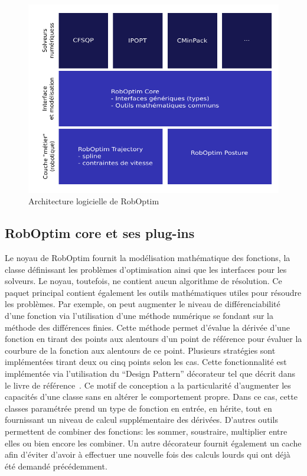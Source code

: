 \begin{figure}
  \begin{center}
    \includegraphics{src/chap1-roboptim/roboptim-architecture.pdf}
  \end{center}
  \caption{Architecture logicielle de RobOptim}
\end{figure}

\subsection{RobOptim core et ses plug-ins}

Le noyau de RobOptim fournit la modélisation mathématique des
fonctions, la classe définissant les problèmes d'optimisation ainsi
que les interfaces pour les solveurs. Le noyau, toutefois, ne contient
aucun algorithme de résolution. Ce paquet principal contient également
les outils mathématiques utiles pour résoudre les problèmes. Par
exemple, on peut augmenter le niveau de différenciabilité d'une
fonction via l'utilisation d'une méthode numérique se fondant sur la
méthode des différences finies. Cette méthode permet d'évalue la
dérivée d'une fonction en tirant des points aux alentours d'un point
de référence pour évaluer la courbure de la fonction aux alentours de
ce point. Plusieurs stratégies sont implémentées tirant deux ou cinq
points selon les cas. Cette fonctionnalité est implémentée via
l'utilisation du ``Design Pattern'' décorateur tel que décrit dans le livre de
référence~\citep{design.pattern}. Ce motif de conception a la
particularité d'augmenter les capacités d'une classe sans en altérer
le comportement propre. Dans ce cas, cette classes paramétrée prend un
type de fonction en entrée, en hérite, tout en fournissant un niveau
de calcul supplémentaire des dérivées. D'autres outils permettent de
combiner des fonctions: les sommer, soustraire, multiplier entre elles
ou bien encore les combiner. Un autre décorateur fournit également un
cache afin d'éviter d'avoir à effectuer une nouvelle fois des calculs
lourds qui ont déjà été demandé précédemment.

